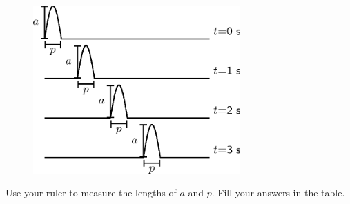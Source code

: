 	\begin{figure}[H] %
    \begin{center}
    \label{m38801*id313002!!!underscore!!!media}\label{m38801*id313002!!!underscore!!!printimage}\includegraphics[width=300px]{col11305.imgs/m38801_PG10C4_003.png} %
        
      \vspace{2pt}
    \vspace{.1in}
    
    \end{center}

 \end{figure}   

    \addtocounter{footnote}{-0}
    
        \par 
        \label{m38801*id313008}Use your ruler to measure the lengths of \begin{math}a\end{math} and \begin{math}p\end{math}. Fill your answers in the table.\par 
        
    
      
